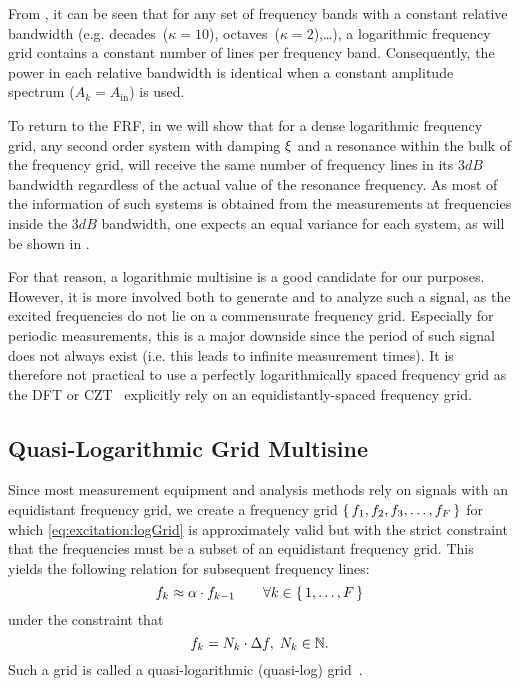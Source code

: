    From , it can be seen that for any set of frequency bands with a constant relative bandwidth (e.g. decades~($\kappa=10$), octaves~($\kappa=2$),\ldots ), a logarithmic  frequency grid contains a constant number of lines per frequency band.
   Consequently, the power in each relative bandwidth is identical when a constant amplitude spectrum ($A_k = A_{\mathrm{in}}$) is used.   

  To return to the \gls{FRF}, in  we will show that for a dense logarithmic frequency grid, any second order system with damping $\xi_{}$ and a resonance within the bulk of the frequency grid, will receive the same number of frequency lines in its $3 \unit{dB}$ bandwidth regardless of the actual value of the resonance frequency.
  As most of the information of such systems is obtained from the measurements at frequencies inside the $3 \unit{dB}$
  bandwidth, one expects an equal variance for each system, as will be shown in .
  
  For that reason, a logarithmic multisine is a good candidate for our purposes.
  However, it is more involved both to generate and to analyze such a signal, as the excited frequencies do not lie on a commensurate frequency grid.
  Especially for periodic measurements, this is a major downside since the period of such signal does not always exist (i.e. this leads to infinite measurement times).
  It is therefore not practical to use a perfectly logarithmically spaced frequency grid as the \gls{DFT} or \gls{CZT}~\citep{Rabiner2004} explicitly rely on an equidistantly-spaced frequency grid.
  
\subsection{Quasi-Logarithmic Grid Multisine}
  Since most measurement equipment and analysis methods rely on signals with an equidistant frequency grid, we create a frequency grid
  $\set{f_1, f_2, f_3,\ldots, f_F}$ for which \eqref{eq:excitation:logGrid} is approximately valid but with the strict constraint that the frequencies must be a subset  of an equidistant frequency grid. 
  This yields the following relation for  subsequent frequency lines:
  \begin{equation}
    f_k \approx \alpha \cdot f_{k-1}
    \qquad \forall k \in \set{1,\ldots,F}
  \label{eq:excitation:qlogGrid}
  \end{equation}
  under the constraint that
  \begin{equation}
    f_k = N_k \cdot \Delta f,\; N_k \in \mathbb{N}
    \text{.}
    \label{eq:excitation:constraintLinGrid}
  \end{equation}
  Such a grid is called a quasi-logarithmic (quasi-log) grid~\citep{Pintelon2012}. 

